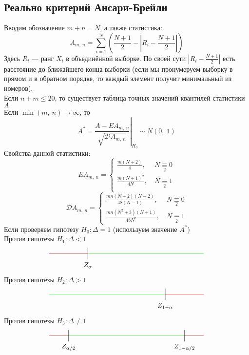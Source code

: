 \documentclass[12pt, a4paper]{article}
\newcommand{\dev}{\mathcal{D}}
\begin{document}
\subsection*{Реально критерий Ансари-Брейли}
Вводим обозначение $m + n = N$, а также статистика:
\[A_{m,\ n} = \sum_{i = 1}^{N} \left( \frac{N + 1}{2} - \left| R_i - \frac{N + 1}{2} \right| \right)\]
Здесь $R_i$ --- ранг $X_i$ в объединённой выборке. По своей сути $\left| R_i - \frac{N + 1}{2} \right|$ есть расстояние до ближайшего конца выборки (если мы пронумеруем выборку в прямом и в обратном порядке, то каждый элемент получит минимальный из номеров).\\
Если $n + m \leq 20$, то существует таблица точных значений квантилей статистики $A$\\
Если $\min(m,\ n) \to \infty$, то
\[A^* = \left.\frac{A - EA_{m,\ n}}{\sqrt{\dev A_{m,\ n}}}\right|_{H_0} \sim N(0,\ 1)\]
Свойства данной статистики:
\[EA_{m,\ n} = \begin{cases}
    \frac{m(N + 2)}{4},\ & N \underset{2}{\equiv} 0\\
    \frac{m(N + 1)^2}{4N},\ & N \underset{2}{\equiv} 1\\
\end{cases}\]
\[\dev A_{m,\ n} = \begin{cases}
    \frac{mn(N + 2)(N - 2)}{48(N - 1)},\ & N \underset{2}{\equiv} 0\\
    \frac{mn(N^2 + 3)(N + 1)}{48 {N}^2},\   & N \underset{2}{\equiv} 1
\end{cases}\]
Если проверяем гипотезу $H_0: \Delta = 1$ (используем значение $A^*$)\\
Против гипотезы $H_1: \Delta < 1$
\[\begin{tikzpicture}[scale = 2]
    \draw[color=green] (-1, 0) -- (2, 0);
    \draw[color=red] (-2, 0) -- (-1, 0);
    \draw (-1, -0.15) -- (-1, 0.15);
    \node at (-1, -0.3) (a) {$Z_{\alpha}$};
\end{tikzpicture}\]
Против гипотезы $H_2: \Delta > 1$
\[\begin{tikzpicture}[scale = 2]
    \draw[color=green] (-2, 0) -- (1, 0);
    \draw[color=red] (1, 0) -- (2, 0);
    \draw (1, 0.15) -- (1, -0.15);
    \node at (1, -0.3) (a) {$Z_{1 - \alpha}$};
\end{tikzpicture}\]
Против гипотезы $H_3: \Delta \neq 1$
\[\begin{tikzpicture}[scale = 2]
    \draw[color=red] (-2, 0) -- (-1.5, 0);
    \draw[color=red] (1.5, 0) -- (2, 0);
    \draw[color=green] (-1.5, 0) -- (1.5, 0);
    \draw (1.5, -0.15) -- (1.5, 0.15);
    \draw (-1.5, -0.15) -- (-1.5, 0.15);
    \node at(-1.5, -0.3) (a) {$Z_{\alpha/2}$};
    \node at(1.5, -0.3) (a) {$Z_{1 - \alpha/2}$};
\end{tikzpicture}\]
\end{document}
